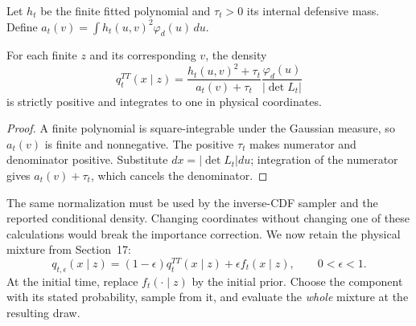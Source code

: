 Let $h_t$ be the finite fitted polynomial and $\tau_t>0$ its internal
defensive mass. Define $a_t(v)=\int h_t(u,v)^2\varphi_d(u)\,du$.
\begin{proposition}
\label{prop:a11-conditional}
For each finite $z$ and its corresponding $v$, the density
\begin{equation}
 q_t^{TT}(x\mid z)=
 \frac{h_t(u,v)^2+\tau_t}{a_t(v)+\tau_t}
 \frac{\varphi_d(u)}{|\det L_t|}
 \label{eq:a11-conditional}
\end{equation}
is strictly positive and integrates to one in physical coordinates.
\end{proposition}
\begin{proof}
A finite polynomial is square-integrable under the Gaussian measure, so
$a_t(v)$ is finite and nonnegative. The positive $\tau_t$ makes numerator
and denominator positive. Substitute $dx=|\det L_t|du$; integration of the
numerator gives $a_t(v)+\tau_t$, which cancels the denominator.
\end{proof}

The same normalization must be used by the inverse-CDF sampler and the
reported conditional density. Changing coordinates without changing one of
these calculations would break the importance correction. We now retain
the physical mixture from Section~17:
\begin{equation}
 q_{t,\epsilon}(x\mid z)=(1-\epsilon)q_t^{TT}(x\mid z)
                  +\epsilon f_t(x\mid z),\qquad 0<\epsilon<1.
 \label{eq:a11-mixture}
\end{equation}
At the initial time, replace $f_t(\cdot\mid z)$ by the initial prior.
Choose the component with its stated probability, sample from it, and
evaluate the \emph{whole} mixture at the resulting draw.

